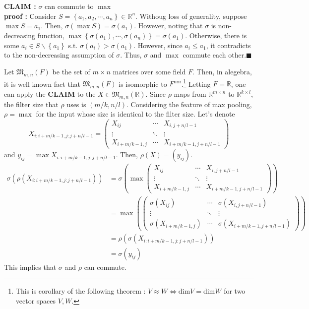 \documentclass[10pt]{article}
\begin{document}
\section{}
\textbf{CLAIM : }$\sigma$ can commute to $\max$
\\
\textbf{proof : }
Consider $S = \left\{a_1,a_2,\cdots, a_n\right\}\in\mathbb{R}^n$. Withoug loss of generality, suppose $\max S = a_1$. Then, $\sigma(\max S) = \sigma(a_1)$. 
However, noting that $\sigma$ is non-decreasing function, $\max\left\{\sigma(a_1), \cdots,\sigma(a_n) \right\} = \sigma(a_1)$. Otherwise, there is some $a_i \in S\backslash\left\{a_1\right\}$ s.t. $\sigma(a_i) > \sigma(a_1)$. However, since $a_i\le a_1$, it contradicts to the non-decreasing assumption of $\sigma$.
Thus, $\sigma$ and $\max$ commute each other.$\blacksquare$

Let $\mathfrak{M}_{m,n}(F)$ be the set of $m\times n$ matrices over some field $F$. Then, in alegebra, it is well known fact that $\mathfrak{M}_{m,n}(F)$ is isomorphic to $F^{mn}$.\footnote{This is corollary of the following theorem : $V \approx W \iff \text{dim}V = \text{dim}W$ for two vector spaces $V, W$.}
Letting $F = \mathbb{R}$, one can apply the \textbf{CLAIM} to the $X\in\mathfrak{M}_{m,n}(\mathbb{R})$.
Since $\rho$ maps from $\mathbb{R}^{m\times n}$ to $\mathbb{R}^{k\times l}$, the filter size that $\rho$ uses is $(m/k, n/l)$. 
Considering the feature of max pooling, $\rho = \max$ for the input whose size is identical to the filter size. 
Let's denote
\begin{equation*}
    X_{i:i+m/k-1, j:j+n/l-1} = \begin{pmatrix}
        X_{ij} & \cdots & X_{i,j+n/l-1} \\ \vdots & \ddots & \vdots \\ X_{i+m/k-1,j} & \cdots & X_{i+m/k-1,j+n/l-1}
    \end{pmatrix}
\end{equation*}
and $y_{ij} = \max X_{i:i+m/k-1,j:j+n/l-1}$. Then, $\rho(X) = (y_{ij})$. 
\begin{align*}
    \sigma(\rho(X_{i:i+m/k-1,j:j+n/l-1})) &= \sigma\left(\max \begin{pmatrix}X_{ij} & \cdots & X_{i,j+n/l-1} \\ \vdots & \ddots & \vdots \\ X_{i+m/k-1,j} & \cdots & X_{i+m/k-1,j+n/l-1} \end{pmatrix}\right)
    \\ &= \max \left(\begin{pmatrix}
        \sigma(X_{ij}) & \cdots & \sigma(X_{i,j+n/l-1}) \\ \vdots & \ddots & \vdots \\ \sigma(X_{i+m/k-1,j}) & \cdots & \sigma(X_{i+m/k-1,j+n/l-1})
    \end{pmatrix}\right)
    \\ &= \rho(\sigma(X_{i:i+m/k-1,j:j+n/l-1}))
    \\ &= \sigma(y_{ij})
\end{align*}
This implies that $\sigma$ and $\rho$ can commute.
\end{document}
